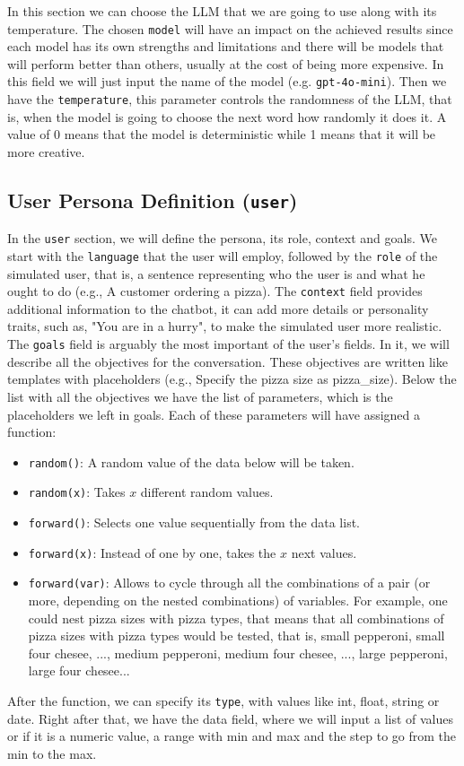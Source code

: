 In this section we can choose the \acl{LLM} that we are going to use
along with its temperature.
The chosen \texttt{model} will have an impact on the achieved results
since each model has its own strengths and limitations
and there will be models that will perform better than others,
usually at the cost of being more expensive.
In this field we will just input the name of the model (e.g. \texttt{gpt-4o-mini}).
Then we have the \texttt{temperature},
this parameter controls the randomness of the \ac{LLM},
that is, when the model is going to choose the next word
how randomly it does it.
A value of 0 means that the model is deterministic
while 1 means that it will be more creative.

\subsection{User Persona Definition (\texttt{user})}

In the \texttt{user} section, we will define
the persona, its role, context and goals.
We start with the \texttt{language} that the user will employ,
followed by the \texttt{role} of the simulated user,
that is, a sentence representing who the user is
and what he ought to do (e.g., A customer ordering a pizza).
The \texttt{context} field provides additional information to the chatbot,
it can add more details or personality traits, such as,
"You are in a hurry", to make the simulated user more realistic.
The \texttt{goals} field is arguably the most important of the user's fields.
In it, we will describe all the objectives for the conversation.
These objectives are written like templates with placeholders
(e.g., Specify the pizza size as {{pizza\_size}}).
Below the list with all the objectives
we have the list of parameters, which is the placeholders we left in goals.
Each of these parameters will have assigned a function:
\begin{itemize}
  \item \texttt{random()}: A random value of the data below will be taken.
  \item \texttt{random(x)}: Takes $x$ different random values.
  \item \texttt{forward()}: Selects one value sequentially from the data list.
  \item \texttt{forward(x)}: Instead of one by one, takes the $x$ next values.
  \item \texttt{forward(var)}: 
    Allows to cycle through all the combinations of a pair (or more, depending on the nested combinations) of variables.
    For example, one could nest pizza sizes with pizza types,
    that means that all combinations of pizza sizes with pizza types would be tested,
    that is, small pepperoni, small four chesee, ..., medium pepperoni, medium four chesee, ..., large pepperoni, large four chesee...
\end{itemize}
After the function, we can specify its \texttt{type},
with values like int, float, string or date.
Right after that, we have the data field,
where we will input a list of values
or if it is a numeric value, a range with min and max
and the step to go from the min to the max.

